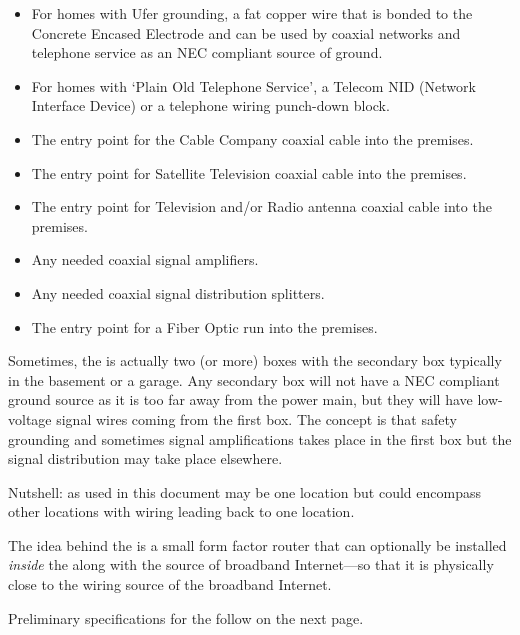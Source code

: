 \pagebreak

\begin{itemize}
  \item For homes with Ufer grounding, a fat copper wire that is bonded to the Concrete Encased Electrode
        and can be used by coaxial networks and telephone service as an NEC compliant source of ground.
  \item For homes with `Plain Old Telephone Service', a Telecom NID (Network Interface Device) or a telephone
        wiring punch-down block.
  \item The entry point for the Cable Company coaxial cable into the premises.
  \item The entry point for Satellite Television coaxial cable into the premises.
  \item The entry point for Television and/or Radio antenna coaxial cable into the premises.
  \item Any needed coaxial signal amplifiers.
  \item Any needed coaxial signal distribution splitters.
  \item The entry point for a Fiber Optic run into the premises.
\end{itemize}

Sometimes, the \tcab{} is actually two (or more) boxes with the secondary box typically in the basement or a garage.
Any secondary box will not have a NEC compliant ground source as it is too far away from the power main, but they
will have low-voltage signal wires coming from the first box. The concept is that safety grounding and sometimes
signal amplifications takes place in the first box but the signal distribution may take place elsewhere.

Nutshell: \tcab{} as used in this document may be one location but could encompass other locations with wiring
leading back to one location.

The idea behind the  is a small form factor router that can optionally be installed
\emph{inside} the \tcab{} along with the source of broadband Internet---so that it is physically close to
the wiring source of the broadband Internet.

Preliminary specifications for the  follow on the next page.

\clearpage

